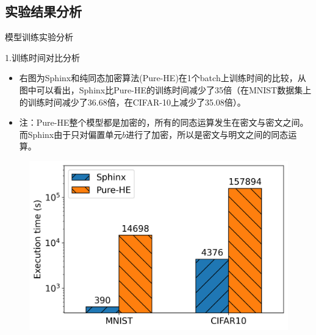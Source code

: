 \documentclass{beamer}
\begin{document}
\subsection{实验结果分析}
\begin{frame}{模型训练实验分析}
    \begin{minipage}[l]{0.7\linewidth}
    \begin{exampleblock}{1.训练时间对比分析}
        	\begin{itemize}
    		\item {\footnotesize 右图为Sphinx和纯同态加密算法(Pure-HE)在1个batch上训练时间的比较，从图中可以看出，Sphinx比Pure-HE的训练时间减少了35倍（在MNIST数据集上的训练时间减少了36.68倍，在CIFAR-10上减少了35.08倍）。}
    		\item {\footnotesize 注：Pure-HE整个模型都是加密的，所有的同态运算发生在密文与密文之间。而Sphinx由于只对偏置单元$b$进行了加密，所以是密文与明文之间的同态运算。}
    	\end{itemize}
   \end{exampleblock}
   \end{minipage}
    \begin{minipage}{0.2\linewidth}
        \begin{figure}[h]
            \centering
            \includegraphics[height=.3\textheight]{pic/fig6.png}
             \hspace{2cm}
        \end{figure}  
    \end{minipage}
\end{frame}
\end{document}
